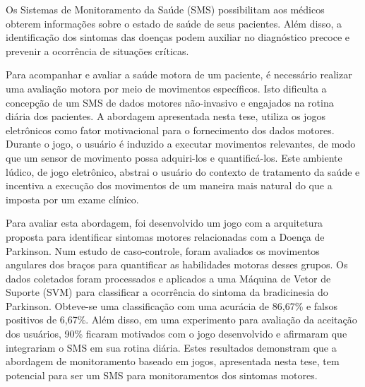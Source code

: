 Os Sistemas de Monitoramento da Saúde (SMS) possibilitam aos médicos obterem informações sobre o estado de saúde de seus pacientes. Além disso, a identificação dos sintomas das doenças podem auxiliar no diagnóstico precoce e prevenir a ocorrência de situações críticas.

Para acompanhar e avaliar a saúde motora de um paciente, é necessário realizar uma avaliação motora por meio de movimentos específicos. Isto dificulta a concepção de um SMS de dados motores não-invasivo e engajados na rotina diária dos pacientes. A abordagem apresentada nesta tese, utiliza os jogos eletrônicos como fator motivacional para o fornecimento dos dados motores. Durante o jogo, o usuário é induzido a executar movimentos relevantes, de modo que um sensor de movimento possa adquiri-los e quantificá-los. Este ambiente lúdico, de jogo eletrônico, abstrai o usuário do contexto de tratamento da saúde e incentiva a execução dos movimentos de um maneira mais natural do que a imposta por um exame clínico.

Para avaliar esta abordagem, foi desenvolvido um jogo com a arquitetura proposta para identificar sintomas motores relacionadas com a Doença de Parkinson. Num estudo de caso-controle, foram avaliados 
os movimentos angulares dos braços ​​para quantificar as habilidades motoras desses grupos. Os dados coletados foram processados ​​e aplicados a uma Máquina de Vetor de Suporte (SVM) para classificar a ocorrência do sintoma da bradicinesia do Parkinson. Obteve-se uma classificação com uma acurácia de 86,67\% e falsos positivos de 6,67\%. Além disso, em uma experimento para avaliação da aceitação dos usuários, 90\% ficaram motivados com o jogo desenvolvido e afirmaram que integrariam o SMS em sua rotina diária. Estes resultados demonstram que a abordagem de monitoramento baseado em jogos, apresentada nesta tese, tem potencial para ser um SMS para monitoramentos dos sintomas motores.







